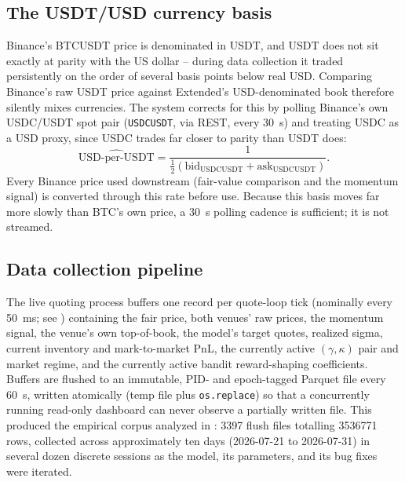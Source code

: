 \documentclass[11pt,a4paper]{article}
\begin{document}
\subsection{The USDT/USD currency basis}
\label{sec:basis}

Binance's BTCUSDT price is denominated in USDT, and USDT does not sit exactly at parity with the
US dollar -- during data collection it traded persistently on the order of several basis points
below real USD. Comparing Binance's raw USDT price against Extended's USD-denominated book
therefore silently mixes currencies. The system corrects for this by polling Binance's own
USDC/USDT spot pair (\texttt{USDCUSDT}, via REST, every \SI{30}{\second}) and treating USDC as a
USD proxy, since USDC trades far closer to parity than USDT does:
\begin{equation}
  \widehat{\text{USD-per-USDT}} = \frac{1}{\tfrac{1}{2}\left(\text{bid}_{\text{USDCUSDT}} +
  \text{ask}_{\text{USDCUSDT}}\right)}.
\end{equation}
Every Binance price used downstream (fair-value comparison and the momentum signal) is converted
through this rate before use. Because this basis moves far more slowly than BTC's own price, a
\SI{30}{\second} polling cadence is sufficient; it is not streamed.

\subsection{Data collection pipeline}

The live quoting process buffers one record per quote-loop tick (nominally every
\SI{50}{\milli\second}; see ) containing the fair price, both venues' raw
prices, the momentum signal, the venue's own top-of-book, the model's target quotes, realized
sigma, current inventory and mark-to-market PnL, the currently active $(\gamma,\kappa)$ pair and
market regime, and the currently active bandit reward-shaping coefficients. Buffers are flushed
to an immutable, PID- and epoch-tagged Parquet file every \SI{60}{\second}, written atomically
(temp file plus \texttt{os.replace}) so that a concurrently running read-only dashboard can never
observe a partially written file. This produced the empirical corpus analyzed in
: \num{3397} flush files totalling \num{3536771} rows, collected across
approximately ten days (2026-07-21 to 2026-07-31) in several dozen discrete sessions as the
model, its parameters, and its bug fixes were iterated.
\end{document}
